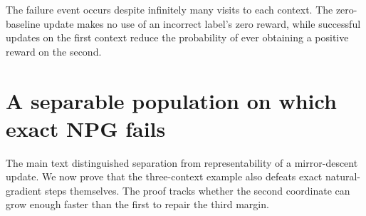\documentclass[11pt,twoside]{article}
\theoremstyle{definition}
\theoremstyle{remark}
\begin{document}
The failure event occurs despite infinitely many visits to each context.
The zero-baseline update makes no use of an incorrect label's zero reward,
while successful updates on the first context reduce the probability of
ever obtaining a positive reward on the second.

\section{A separable population on which exact NPG fails}
\label{app:shared-npg}

The main text distinguished separation from representability of a
mirror-descent update. We now prove that the three-context example also
defeats exact natural-gradient steps themselves. The proof tracks whether
the second coordinate can grow enough faster than the first to repair the
third margin.
\end{document}
